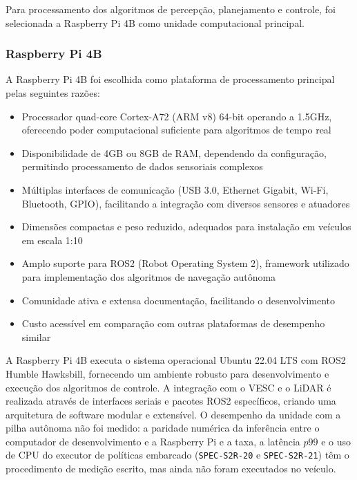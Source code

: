 Para processamento dos algoritmos de percepção, planejamento e controle, foi
selecionada a Raspberry Pi 4B como unidade computacional principal.

\subsubsection{Raspberry Pi 4B}

A Raspberry Pi 4B foi escolhida como plataforma de processamento principal
pelas seguintes razões:

\begin{itemize}
      \item Processador quad-core Cortex-A72 (ARM v8) 64-bit operando a 1.5GHz, oferecendo
            poder computacional suficiente para algoritmos de tempo real
      \item Disponibilidade de 4GB ou 8GB de RAM, dependendo da configuração, permitindo
            processamento de dados sensoriais complexos
      \item Múltiplas interfaces de comunicação (USB 3.0, Ethernet Gigabit, Wi-Fi,
            Bluetooth, GPIO), facilitando a integração com diversos sensores e atuadores
      \item Dimensões compactas e peso reduzido, adequados para instalação em veículos em
            escala 1:10
      \item Amplo suporte para ROS2 (Robot Operating System 2), framework utilizado para
            implementação dos algoritmos de navegação autônoma
      \item Comunidade ativa e extensa documentação, facilitando o desenvolvimento
      \item Custo acessível em comparação com outras plataformas de desempenho similar
\end{itemize}

A Raspberry Pi 4B executa o sistema operacional Ubuntu 22.04 LTS com ROS2
Humble Hawksbill, fornecendo um ambiente robusto para desenvolvimento e
execução dos algoritmos de controle. A integração com o VESC e o LiDAR é
realizada através de interfaces seriais e pacotes ROS2 específicos, criando uma
arquitetura de software modular e extensível. O desempenho da unidade com a
pilha autônoma não foi medido: a paridade numérica da inferência entre o
computador de desenvolvimento e a Raspberry Pi e a taxa, a latência $p99$ e o
uso de CPU do executor de políticas embarcado (\texttt{SPEC-S2R-20} e
\texttt{SPEC-S2R-21}) têm o procedimento de medição escrito, mas ainda não
foram executados no veículo.


